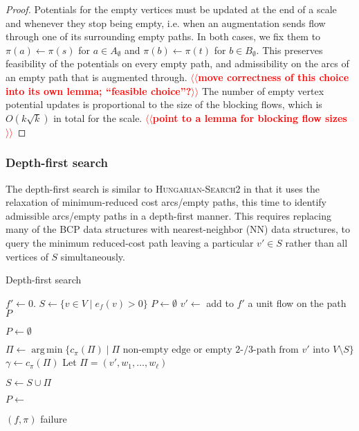 \documentclass[11pt]{article}
\makeatletter
\DeclareMathOperator*{\argmin}{arg\,min}
\theoremstyle{plain}
\def\n@te#1{\textsf{\boldmath \textbf{$\langle\!\langle$#1$\rangle\!\rangle$}}\leavevmode}
\def\note#1{\textcolor{red}{\n@te{#1}}}
\makeatother
\begin{document}
\begin{proof}
Potentials for the empty vertices must be updated at the end of a scale and 
whenever they stop being empty, i.e. when an augmentation sends flow through 
one of its surrounding empty paths.
In both cases, we fix them to $\pi(a) \gets \pi(s)$ for $a \in A_\emptyset$ and 
$\pi(b) \gets \pi(t)$ for $b \in B_\emptyset$.
This preserves feasibility of the potentials on every empty path, and 
admissibility on the arcs of an empty path that is augmented through.
\note{move correctness of this choice into its own lemma; ``feasible choice''?}
The number of empty vertex potential updates is proportional to the size of 
the blocking flows, which is $O(k\sqrt{k})$ in total for the scale. 
\note{point to a lemma for blocking flow sizes}
\end{proof}

\subsubsection{Depth-first search}

The depth-first search is similar to \textsc{Hungarian-Search2} in that it
uses the relaxation of minimum-reduced cost arcs/empty paths, this time to
identify admissible arcs/empty paths in a depth-first manner.
This requires replacing many of the BCP data structures with nearest-neighbor
(NN) data structures, to query the minimum reduced-cost path leaving a
particular $v' \in S$ rather than all vertices of $S$ simultaneously.

\begin{algorithm}
\caption{Depth-first search}
\begin{algorithmic}[1]
	\State $f' \gets 0$.
	\State $S \gets \{v \in V \mid e_f(v) > 0\}$
	\State $P \gets \emptyset$
	\Repeat
		\State $v' \gets$ 
			\State add to $f'$ a unit flow on the path $P$

			\State $P \gets \emptyset$
		\EndIf

		\Statex %
		\State $\Pi \gets \argmin\{c_\pi(\Pi) \mid \text{$\Pi$ non-empty edge or empty 2-/3-path from $v'$ into $V \setminus S$}\}$
		\State $\gamma \gets c_\pi(\Pi)$
		\State Let $\Pi = (v', w_1, \ldots, w_\ell)$

		\Statex %
			\State $S \gets S \cup \Pi$

			\State $P \gets$ 
		\EndIf

		 
			\State\Return $(f, \pi)$
		\EndIf
	\State\Return failure
\EndFunction
\end{algorithmic}
\end{algorithm}
\end{document}
